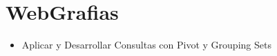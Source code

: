 \section{WebGrafias} 


\begin{itemize}
\item Aplicar y Desarrollar  Consultas con Pivot y Grouping Sets




\end{itemize}